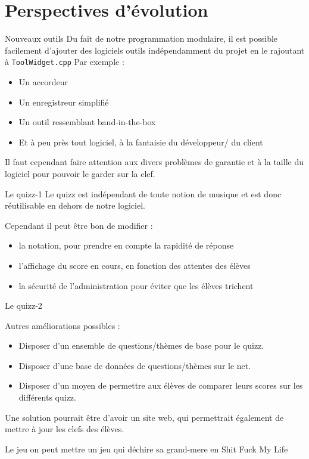 \section{Perspectives d'évolution}

\begin{frame}
  \tableofcontents[currentsection]
\end{frame}
\begin{frame}{Nouveaux outils}
  Du fait de notre programmation modulaire, il est possible facilement d'ajouter des logiciels outils indépendamment du projet en le rajoutant à \texttt{ToolWidget.cpp}
  Par exemple : \\
  \begin{itemize}
  \item Un accordeur
  \item Un enregistreur simplifié
  \item Un outil ressemblant band-in-the-box
  \item Et à peu près tout logiciel, à la fantaisie du développeur/ du client
  \end{itemize}
  
  Il faut cependant faire attention aux divers problèmes de garantie et à la taille du logiciel pour pouvoir le garder sur la clef.
\end{frame}

\begin{frame}{Le quizz-1}
Le quizz est indépendant de toute notion de musique et est donc réutilisable en dehors de notre logiciel.\\
\begin{block}{Cependant il peut être bon de modifier :}
  \begin{itemize}
  \item la notation, pour prendre en compte la rapidité de réponse
  \item l'affichage du score en cours, en fonction des attentes des élèves
  \item la sécurité de l'administration pour éviter que les élèves trichent
  \end{itemize}
\end{block}
\end{frame}
\begin{frame}{Le quizz-2}
\begin{block}{Autres améliorations possibles : }
  \begin{itemize}
  \item Disposer d'un ensemble de questions/thèmes de base pour le quizz.
  \item Disposer d'une base de données de questions/thèmes sur le net.
  \item Disposer d'un moyen de permettre aux élèves de comparer leurs scores sur les différents quizz.
  \end{itemize}  
  Une solution pourrait être d'avoir un site web, qui permettrait également de mettre à jour les clefs des élèves.
\end{block}
\end{frame}

\begin{frame}{Le jeu}
  on peut mettre un jeu qui déchire sa grand-mere en Shit Fuck My Life
\end{frame}

%